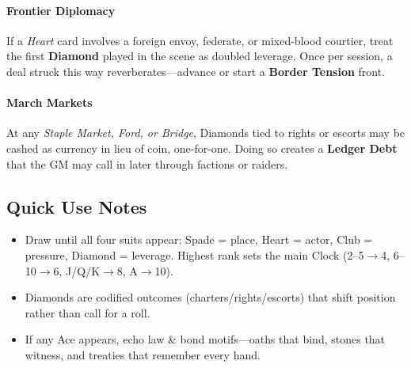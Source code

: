 \paragraph{Frontier Diplomacy}
If a \emph{Heart} card involves a foreign envoy, federate, or mixed-blood courtier, treat the first \textbf{Diamond} played in the scene as doubled leverage. Once per session, a deal struck this way reverberates—advance or start a \textbf{Border Tension} front.

\paragraph{March Markets}
At any \emph{Staple Market, Ford, or Bridge}, Diamonds tied to rights or escorts may be cashed as currency in lieu of coin, one-for-one. Doing so creates a \textbf{Ledger Debt} that the GM may call in later through factions or raiders.

\subsection*{Quick Use Notes}
\label{sec:vilikari-quick-use}
\begin{itemize}
\item Draw until all four suits appear: Spade = place, Heart = actor, Club = pressure, Diamond = leverage. Highest rank sets the main Clock (2--5$\rightarrow$4, 6--10$\rightarrow$6, J/Q/K$\rightarrow$8, A$\rightarrow$10).
\item Diamonds are codified outcomes (charters/rights/escorts) that shift position rather than call for a roll.
\item If any Ace appears, echo law \& bond motifs---oaths that bind, stones that witness, and treaties that remember every hand.
\end{itemize}

